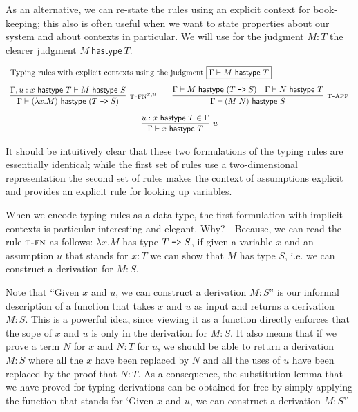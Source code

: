 \newcommand{\hasty}[2]{#1~\mathsf{hastype}~#2}
As an alternative, we can re-state the rules using an explicit context for
book-keeping; this also is often useful when we want to state properties about
our system and about contexts in particular. We will use for the judgment $M:T$
the clearer judgment $\hasty M T$.



\[
\begin{array}{c}
\multicolumn{1}{l}{\mbox{Typing rules with explicit contexts using the judgment
    \fbox{$\Gamma \vdash \hasty M T$}}} \\[1em]
\infer[\TFn^{x,u}]{\Gamma \vdash \hasty {(\lambda x.M)} {(T \arrow S)}}{
  \Gamma, u:\hasty x T \vdash \hasty M S
}  
\qquad
\infer[\TApp]{\Gamma \vdash \hasty {(M\;N)} S}{\Gamma \vdash \hasty M (T \arrow S)
  & \Gamma \vdash \hasty N T}\\[1em]
\infer[u]{\Gamma \vdash \hasty x T}{u:\hasty x T \in \Gamma}
\end{array}
\]

It should be intuitively clear that these two formulations of the typing rules
are essentially identical; while the first set of rules use a two-dimensional
representation the second set of rules makes the context of
assumptions explicit and provides an explicit rule for looking up variables.

When we encode typing rules as a data-type, the first formulation with implicit
contexts is particular interesting and elegant. Why? - Because, we can read the
rule $\textsc{t-fn}$ as follows: $\lambda x.M$ has type $T \mathrel{\texttt{->}} S$, if given a variable
$x$ and an assumption $u$ that stands for $x:T$ we can show that $M$ has type
$S$, i.e. we can construct a derivation for $M:S$.

Note that ``Given $x$ and $u$, we can construct a derivation $M:S$'' is our
informal description of a function that takes $x$ and $u$ as input and returns a
derivation $M:S$. This is a powerful idea, since viewing it as a function
directly enforces that the sope of $x$ and $u$ is only in the derivation for
$M:S$. It also means that if we prove a term $N$ for $x$ and $N:T$ for $u$, we
should be able to return a derivation $M:S$ where all the $x$ have been replaced
by $N$ and all the uses of $u$ have been replaced by the proof that $N:T$. As a
consequence, the substitution lemma that we have proved for typing derivations
can be obtained for free by simply applying the function that stands for `Given
$x$ and $u$, we can construct a derivation $M:S$'' 


